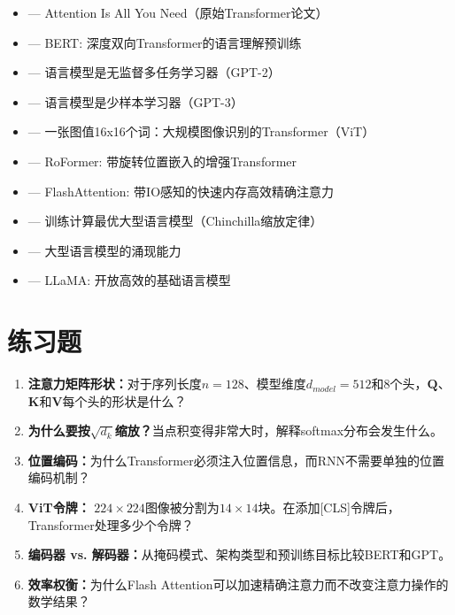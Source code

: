\begin{itemize}
    \item \cite{vaswani2017attention} --- Attention Is All You Need（原始Transformer论文）
    \item \cite{devlin2018bert} --- BERT: 深度双向Transformer的语言理解预训练
    \item \cite{radford2019language} --- 语言模型是无监督多任务学习器（GPT-2）
    \item \cite{brown2020language} --- 语言模型是少样本学习器（GPT-3）
    \item \cite{dosovitskiy2020image} --- 一张图值16x16个词：大规模图像识别的Transformer（ViT）
    \item \cite{su2021roformer} --- RoFormer: 带旋转位置嵌入的增强Transformer
    \item \cite{dao2022flashattention} --- FlashAttention: 带IO感知的快速内存高效精确注意力
    \item \cite{hoffmann2022training} --- 训练计算最优大型语言模型（Chinchilla缩放定律）
    \item \cite{wei2022emergent} --- 大型语言模型的涌现能力
    \item \cite{touvron2023llama} --- LLaMA: 开放高效的基础语言模型
\end{itemize}

\section{练习题}

\begin{enumerate}
    \item \textbf{注意力矩阵形状：}对于序列长度$n=128$、模型维度$d_{model}=512$和8个头，$\mathbf{Q}$、$\mathbf{K}$和$\mathbf{V}$每个头的形状是什么？

    \item \textbf{为什么要按$\sqrt{d_k}$缩放？}当点积变得非常大时，解释softmax分布会发生什么。

    \item \textbf{位置编码：}为什么Transformer必须注入位置信息，而RNN不需要单独的位置编码机制？

    \item \textbf{ViT令牌：} $224\times224$图像被分割为$14\times14$块。在添加[CLS]令牌后，Transformer处理多少个令牌？

    \item \textbf{编码器 vs. 解码器：}从掩码模式、架构类型和预训练目标比较BERT和GPT。

    \item \textbf{效率权衡：}为什么Flash Attention可以加速精确注意力而不改变注意力操作的数学结果？
\end{enumerate}
